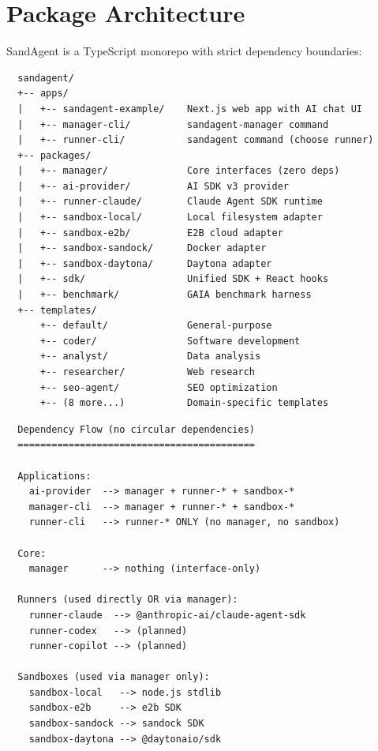 \section{Package Architecture}

SandAgent is a TypeScript monorepo with strict dependency boundaries:

\begin{verbatim}
  sandagent/
  +-- apps/
  |   +-- sandagent-example/    Next.js web app with AI chat UI
  |   +-- manager-cli/          sandagent-manager command
  |   +-- runner-cli/           sandagent command (choose runner)
  +-- packages/
  |   +-- manager/              Core interfaces (zero deps)
  |   +-- ai-provider/          AI SDK v3 provider
  |   +-- runner-claude/        Claude Agent SDK runtime
  |   +-- sandbox-local/        Local filesystem adapter
  |   +-- sandbox-e2b/          E2B cloud adapter
  |   +-- sandbox-sandock/      Docker adapter
  |   +-- sandbox-daytona/      Daytona adapter
  |   +-- sdk/                  Unified SDK + React hooks
  |   +-- benchmark/            GAIA benchmark harness
  +-- templates/
      +-- default/              General-purpose
      +-- coder/                Software development
      +-- analyst/              Data analysis
      +-- researcher/           Web research
      +-- seo-agent/            SEO optimization
      +-- (8 more...)           Domain-specific templates
\end{verbatim}

\begin{verbatim}
  Dependency Flow (no circular dependencies)
  ==========================================

  Applications:
    ai-provider  --> manager + runner-* + sandbox-*
    manager-cli  --> manager + runner-* + sandbox-*
    runner-cli   --> runner-* ONLY (no manager, no sandbox)

  Core:
    manager      --> nothing (interface-only)

  Runners (used directly OR via manager):
    runner-claude  --> @anthropic-ai/claude-agent-sdk
    runner-codex   --> (planned)
    runner-copilot --> (planned)

  Sandboxes (used via manager only):
    sandbox-local   --> node.js stdlib
    sandbox-e2b     --> e2b SDK
    sandbox-sandock --> sandock SDK
    sandbox-daytona --> @daytonaio/sdk
\end{verbatim}
